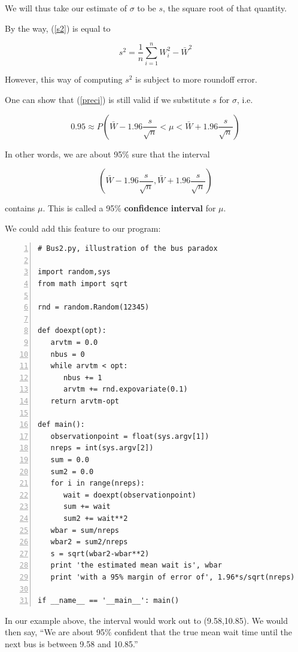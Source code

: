 We will thus take our estimate of $\sigma$ to be $s$, the square root of
that quantity.

By the way, (\ref{s2}) is equal to 

\begin{equation}
\label{alts2}
s^2 = \frac{1}{n} \sum_{i=1}^{n} W_i^2 - \bar{W}^2
\end{equation}

However, this way of computing $s^2$ is subject to more roundoff error.

One can show that (\ref{preci}) is still valid if we substitute $s$ for
$\sigma$, i.e.

\begin{equation}
0.95 \approx P \left ( \bar{W} - 1.96 \frac{s}{\sqrt{n}} < \mu
< \bar{W} + 1.96 \frac{s}{\sqrt{n}} \right ) 
\end{equation}

In other words, we are about 95\% sure that the interval 

\begin{equation}
\label{meanci}
(\bar{W} - 1.96 \frac{s}{\sqrt{n}}, \bar{W} + 1.96 \frac{s}{\sqrt{n}})
\end{equation}

contains $\mu$.  This is called a 95\% {\bf confidence interval} for $\mu$.

We could add this feature to our program:

\begin{Verbatim}[fontsize=\relsize{-2},numbers=left]
# Bus2.py, illustration of the bus paradox

import random,sys
from math import sqrt

rnd = random.Random(12345)

def doexpt(opt):
   arvtm = 0.0
   nbus = 0
   while arvtm < opt:
      nbus += 1
      arvtm += rnd.expovariate(0.1)
   return arvtm-opt

def main():
   observationpoint = float(sys.argv[1])
   nreps = int(sys.argv[2])
   sum = 0.0
   sum2 = 0.0
   for i in range(nreps):
      wait = doexpt(observationpoint)
      sum += wait
      sum2 += wait**2
   wbar = sum/nreps
   wbar2 = sum2/nreps
   s = sqrt(wbar2-wbar**2)
   print 'the estimated mean wait is', wbar
   print 'with a 95% margin of error of', 1.96*s/sqrt(nreps)

if __name__ == '__main__': main()
\end{Verbatim}

In our example above, the interval would work out to (9.58,10.85).  We
would then say, ``We are about 95\% confident that the true mean wait
time until the next bus is between 9.58 and 10.85.''

